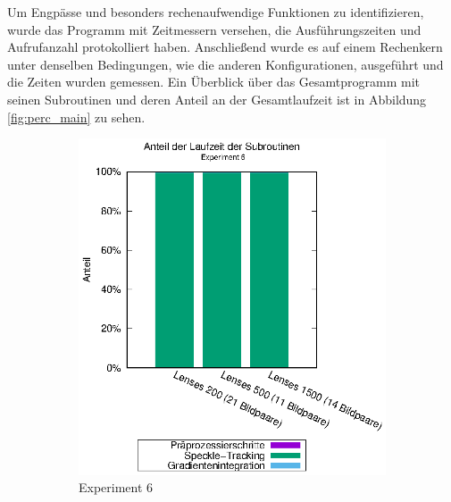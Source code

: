 Um Engpässe und besonders rechenaufwendige Funktionen zu identifizieren, wurde das Programm mit Zeitmessern versehen, die Ausführungszeiten und Aufrufanzahl protokolliert haben. Anschließend wurde es auf einem Rechenkern unter denselben Bedingungen, wie die anderen Konfigurationen, ausgeführt und die Zeiten wurden gemessen. Ein Überblick über das Gesamtprogramm mit seinen Subroutinen und deren Anteil an der Gesamtlaufzeit ist in Abbildung \ref{fig:perc_main} zu sehen.

\begin{center}
	\begin{figure}[htbp]
		\begin{subfigure}[b]{0.5\textwidth}
			\centering
			\includegraphics[width=\textwidth]{pdf/main_exp6}
			\caption{Experiment 6}
			\label{fig:perc_main_exp6}
		\end{subfigure}
		\begin{subfigure}[b]{0.5\textwidth}
			\centering

\end{subfigure}
\end{figure}
\end{center}

